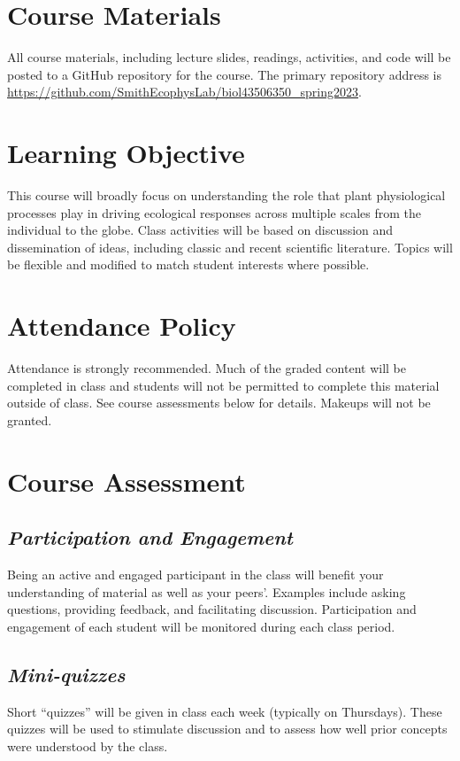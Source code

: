 \documentclass[12pt, notitlepage]{article}   	%
\begin{document}
{\section{Course Materials}
All course materials, including lecture slides, readings, activities, and code 
will be posted to a GitHub repository for the course.
The primary repository address is
\url{https://github.com/SmithEcophysLab/biol43506350_spring2023}.

\section{Learning Objective}
This course will broadly focus on understanding the role that plant physiological 
processes play in driving ecological responses across multiple scales from the individual 
to the globe. Class activities will be based on discussion and dissemination of ideas, 
including classic and recent scientific literature. 
Topics will be flexible and modified to match student interests where possible.

\section{Attendance Policy}
Attendance is strongly recommended. 
Much of the graded content will be completed in class and students will not be permitted
to complete this material outside of class. See course assessments below for details.
Makeups will not be granted.

\section{Course Assessment}
\subsection{\textit{Participation and Engagement}}
Being an active and engaged participant in the class will benefit your understanding
of material as well as your peers'. Examples include asking questions, providing feedback,
and facilitating discussion. Participation and engagement of each student will be monitored
during each class period.

\subsection{\textit{Mini-quizzes}}
Short “quizzes” will be given in class each week (typically on Thursdays). 
These quizzes will be used to stimulate discussion and to assess how well 
prior concepts were understood by the class.

}
\end{document}
